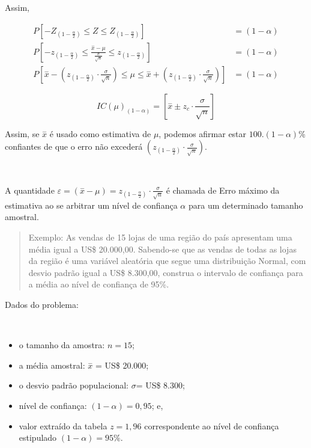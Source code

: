 \documentclass[
]{book}
\providecommand{\tightlist}{%
  \setlength{\itemsep}{0pt}\setlength{\parskip}{0pt}}
\begin{document}
\hfill\break

Assim,

\hfill\break

\begin{align*}
P\left[-{Z}_{(1-\frac{\alpha }{2})}\le Z \le {Z }_{(1-\frac{\alpha }{2})}\right] & = (1-\alpha) \\ 
P\left[-{z}_{(1-\frac{\alpha }{2})}\le \frac{\stackrel{-}{x}-\mu }{\frac{\sigma}{\sqrt{n}}}
\le {z}_{(1-\frac{\alpha }{2})}\right] & = (1-\alpha) \\
P[\stackrel{-}{x}-({z}_{(1-\frac{\alpha }{2})} \cdot \frac{\sigma}{\sqrt{n}}) \le \mu \le \stackrel{-}{x}+({z}_{(1-\frac{\alpha }{2})} \cdot \frac{\sigma}{\sqrt{n}})     ] & = (1-\alpha)  
\end{align*}

\hfill\break

\[
IC(\mu)_{(1-\alpha)} = [\stackrel{-}{x} \pm {z}_{c} \cdot \frac{\sigma}{\sqrt{n}}]
\]

\hfill\break

Assim, se \(\stackrel{-}{x}\) é usado como estimativa de \(\mu\), podemos afirmar estar \(100.(1-\alpha)\)\% confiantes de que o erro não excederá \(({z}_{(1-\frac{\alpha }{2})} \cdot \frac{\sigma}{\sqrt{n}})\).

~

A quantidade \(\varepsilon=(\stackrel{-}{x}-\mu)={z}_{(1-\frac{\alpha }{2})} \cdot \frac{\sigma}{\sqrt{n}}\) é chamada de Erro máximo da estimativa ao se arbitrar um nível de confiança \(\alpha\) para um determinado tamanho amostral.

\hfill\break

\begin{quote}
Exemplo: As vendas de 15 lojas de uma região do país apresentam uma média igual a US\$ 20.000,00. Sabendo-se que as vendas de todas as lojas da região é uma variável aleatória que segue uma distribuição Normal, com desvio padrão igual a US\$ 8.300,00, construa o intervalo de confiança para a média ao nível de confiança de 95\%.
\end{quote}

\hfill\break

Dados do problema:

~

\begin{itemize}
\tightlist
\item
  o tamanho da amostra: \(n=15\);\\
\item
  a média amostral: \(\stackrel{-}{x}\) = US\$ 20.000;\\
\item
  o desvio padrão populacional: \(\sigma\)= US\$ 8.300;\\
\item
  nível de confiança: \((1-\alpha) = 0,95\); e,
\item
  valor extraído da tabela \(z=1,96\) correspondente ao nível de confiança estipulado \((1-\alpha)=95\%\).
\end{itemize}
\end{document}
